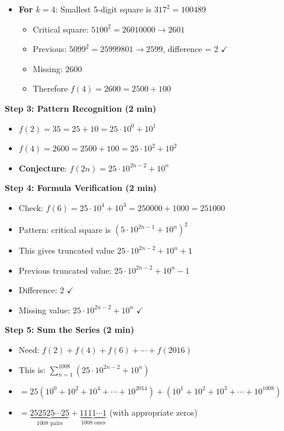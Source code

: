 \documentclass[]{article}
\begin{document}
\begin{solutionbox}
\begin{itemize}[leftmargin=*]
    \item \textbf{For $k=4$}: Smallest 5-digit square is $317^2 = 100489$
    \begin{itemize}
        \item Critical square: $5100^2 = 26010000 \to 2601$
        \item Previous: $5099^2 = 25999801 \to 2599$, difference = 2 $\checkmark$
        \item Missing: $2600$
        \item Therefore $f(4) = 2600 = 2500 + 100$
    \end{itemize}
\end{itemize}

\textbf{Step 3: Pattern Recognition (2 min)}
\begin{itemize}[leftmargin=*]
    \item $f(2) = 35 = 25 + 10 = 25 \cdot 10^0 + 10^1$
    \item $f(4) = 2600 = 2500 + 100 = 25 \cdot 10^2 + 10^2$
    \item \textbf{Conjecture}: $f(2n) = 25 \cdot 10^{2n-2} + 10^n$
\end{itemize}

\textbf{Step 4: Formula Verification (2 min)}
\begin{itemize}[leftmargin=*]
    \item Check: $f(6) = 25 \cdot 10^4 + 10^3 = 250000 + 1000 = 251000$
    \item Pattern: critical square is $(5 \cdot 10^{2n-1} + 10^n)^2$
    \item This gives truncated value $25 \cdot 10^{2n-2} + 10^n + 1$
    \item Previous truncated value: $25 \cdot 10^{2n-2} + 10^n - 1$
    \item Difference: $2$ $\checkmark$
    \item Missing value: $25 \cdot 10^{2n-2} + 10^n$ $\checkmark$
\end{itemize}

\textbf{Step 5: Sum the Series (2 min)}
\begin{itemize}[leftmargin=*]
    \item Need: $f(2) + f(4) + f(6) + \cdots + f(2016)$
    \item This is: $\sum_{n=1}^{1008} (25 \cdot 10^{2n-2} + 10^n)$
    \item $= 25(10^0 + 10^2 + 10^4 + \cdots + 10^{2014}) + (10^1 + 10^2 + 10^3 + \cdots + 10^{1008})$
    \item $= \underbrace{252525\cdots25}_{1008 \text{ pairs}} + \underbrace{1111\cdots1}_{1008 \text{ ones}}$ (with appropriate zeros)
\end{itemize}


\end{solutionbox}
\end{document}
